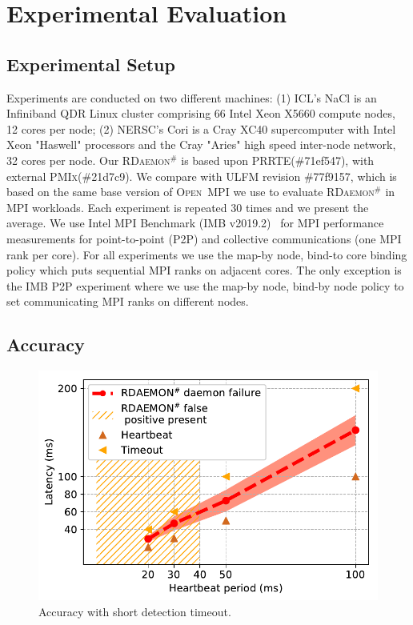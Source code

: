 \documentclass[5p,times,twocolumn]{elsarticle}
\newcommand{\prrte}[0]{\textsc{PRRTE}\xspace}
\newcommand{\pmix}[0]{\textsc{PMIx}\xspace}
\newcommand{\ompi}[0]{\textsc{Open~MPI}\xspace}
\newcommand{\ulfm}[0]{\textsc{ULFM}\xspace}
\newcommand{\mpi}[0]{\textsc{MPI}\xspace}
\newcommand{\ourwork}[0]{\textsc{RDaemon}\ensuremath{^\#}\xspace}
\newcommand{\imb}[0]{\textsc{IMB}\xspace}
\begin{document}
\section{Experimental Evaluation}\label{sec:experiments}

\subsection{Experimental Setup}
Experiments are conducted on two different machines: (1) ICL's NaCl is an Infiniband QDR Linux cluster comprising 66 Intel Xeon X5660 compute nodes, 12 cores per node; (2) NERSC's Cori
is a Cray XC40 supercomputer with Intel Xeon "Haswell" processors and the Cray "Aries" high speed inter-node network, 32 cores per node. Our \ourwork is based upon \prrte (\#71ef547), with external \pmix (\#21d7c9). We compare with \ulfm revision \#77f9157, which is based on the same base version of \ompi we use to evaluate \ourwork in \mpi workloads. Each experiment is repeated 30 times and we present the average. We use Intel \mpi Benchmark (\imb v2019.2)~\cite{IMB} for \mpi performance measurements for point-to-point (P2P) and collective communications (one \mpi rank per core). For all experiments we use the map-by node, bind-to core binding policy which puts sequential \mpi ranks on adjacent cores. The only exception is the \imb P2P experiment where we use
the map-by node, bind-by node policy to set communicating \mpi ranks on different nodes.

\subsection{Accuracy}
\begin{figure}[h]
  \centering
  \includegraphics[width=\linewidth]{accuracy.pdf}\vspace{-1em}
  \caption{Accuracy with short detection timeout.}
  \label{fig:accuracy}
\end{figure}
\end{document}
